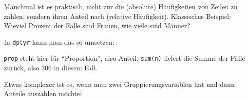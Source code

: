 \documentclass[12pt,ngerman,]{book}
\makeatletter
\newenvironment{Shaded}{\begin{snugshade}}{\end{snugshade}}
\newcommand{\KeywordTok}[1]{\textcolor[rgb]{0.13,0.29,0.53}{\textbf{{#1}}}}
\newcommand{\DataTypeTok}[1]{\textcolor[rgb]{0.13,0.29,0.53}{{#1}}}
\newcommand{\StringTok}[1]{\textcolor[rgb]{0.31,0.60,0.02}{{#1}}}
\newcommand{\CommentTok}[1]{\textcolor[rgb]{0.56,0.35,0.01}{\textit{{#1}}}}
\newcommand{\NormalTok}[1]{{#1}}
\newenvironment{kframe}{%
\medskip{}
\setlength{\fboxsep}{.8em}
 \def\at@end@of@kframe{}%
 \ifinner\ifhmode%
  \def\at@end@of@kframe{\end{minipage}}%
  \begin{minipage}{\columnwidth}%
 \fi\fi%
 \def\FrameCommand##1{\hskip\@totalleftmargin \hskip-\fboxsep
 \colorbox{shadecolor}{##1}\hskip-\fboxsep
     \hskip-\linewidth \hskip-\@totalleftmargin \hskip\columnwidth}%
 \MakeFramed {\advance\hsize-\width
   \@totalleftmargin\z@ \linewidth\hsize
   \@setminipage}}%
 {\par\unskip\endMakeFramed%
 \at@end@of@kframe}
\renewenvironment{Shaded}{\begin{kframe}}{\end{kframe}}
\makeatother
\begin{document}
Manchmal ist es praktisch, nicht zur die (absolute) Häufigkeiten von
Zeilen zu zählen, sondern ihren Anteil nach (relative Häufigkeit).
Klassisches Beispiel: Wieviel Prozent der Fälle sind Frauen, wie viele
sind Männer?

In \texttt{dplyr} kann man das so umsetzen:

\begin{Shaded}
\end{Shaded}

\texttt{prop} steht hier für ``Proportion'', also Anteil.
\texttt{sum(n)} liefert die Summe der Fälle zurück, also 306 in diesem
Fall.

Etwas komplexer ist es, wenn man zwei Gruppierungsvariablen hat und dann
Anteile auszählen möchte:
\end{document}
